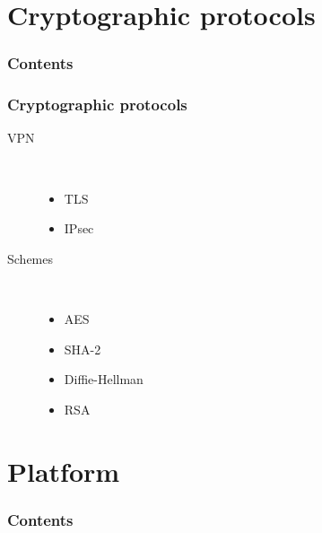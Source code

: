 \documentclass[xcolor={x11names, rgb, usenames, dvipsnames}]{beamer}
\begin{document}
\section{Cryptographic protocols}
\begin{frame}
\frametitle{Contents}
\tableofcontents[%
	currentsection,
	sectionstyle=show/shaded,%
	subsectionstyle=show/show/hide,%
	]
\end{frame}


\begin{frame}
\frametitle{Cryptographic protocols}
\begin{description}
	\item[VPN]~\\
		\begin{itemize}
			\item TLS
			\item IPsec
		\end{itemize}
	\item[Schemes]~\\
		\begin{itemize}
			\item AES
			\item SHA-2
			\item Diffie-Hellman
			\item RSA
		\end{itemize}
\end{description}
\end{frame}



\section{Platform}
\begin{frame}
\frametitle{Contents}
\tableofcontents[%
	currentsection,
	sectionstyle=show/shaded,%
	subsectionstyle=show/show/hide,%
	]
\end{frame}
\end{document}
